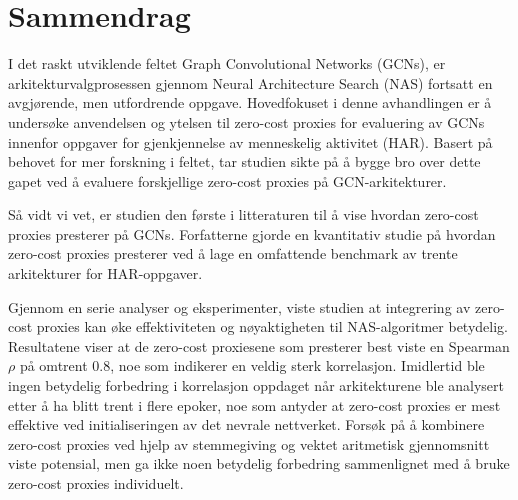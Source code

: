 \chapter*{Sammendrag}

I det raskt utviklende feltet Graph Convolutional Networks (GCNs), er arkitekturvalgprosessen gjennom Neural Architecture Search (NAS) fortsatt en avgjørende, men utfordrende oppgave. Hovedfokuset i denne avhandlingen er å undersøke anvendelsen og ytelsen til zero-cost proxies for evaluering av GCNs innenfor oppgaver for gjenkjennelse av menneskelig aktivitet (HAR). Basert på behovet for mer forskning i feltet, tar studien sikte på å bygge bro over dette gapet ved å evaluere forskjellige zero-cost proxies på GCN-arkitekturer. 

Så vidt vi vet, er studien den første i litteraturen til å vise hvordan zero-cost proxies presterer på GCNs. Forfatterne gjorde en kvantitativ studie på hvordan zero-cost proxies presterer ved å lage en omfattende benchmark av trente arkitekturer for HAR-oppgaver. 

Gjennom en serie analyser og eksperimenter, viste studien at integrering av zero-cost proxies kan øke effektiviteten og nøyaktigheten til NAS-algoritmer betydelig. Resultatene viser at de zero-cost proxiesene som presterer best viste en Spearman $\rho$ på omtrent $0.8$, noe som indikerer en veldig sterk korrelasjon. Imidlertid ble ingen betydelig forbedring i korrelasjon oppdaget når arkitekturene ble analysert etter å ha blitt trent i flere epoker, noe som antyder at zero-cost proxies er mest effektive ved initialiseringen av det nevrale nettverket. Forsøk på å kombinere zero-cost proxies ved hjelp av stemmegiving og vektet aritmetisk gjennomsnitt viste potensial, men ga ikke noen betydelig forbedring sammenlignet med å bruke zero-cost proxies individuelt. 